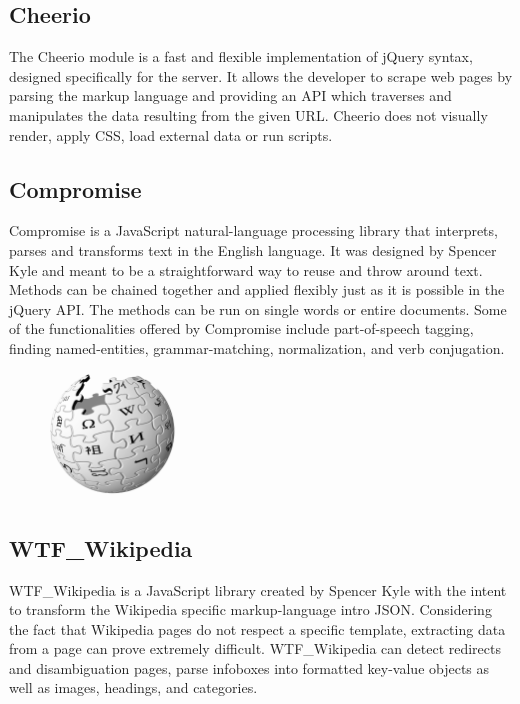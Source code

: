 \documentclass{report}
\begin{document}
\subsection {Cheerio}
The Cheerio module is a fast and flexible implementation of jQuery syntax, designed specifically for the server. It allows the developer to scrape web pages by parsing the markup language and providing an API which traverses and manipulates the data resulting from the given URL. Cheerio does not visually render, apply CSS, load external data or run scripts.

\subsection {Compromise}
Compromise is a JavaScript natural-language processing library that interprets, parses and transforms text in the English language. It was designed by Spencer Kyle and meant to be a straightforward way to reuse and throw around text. Methods can be chained together and applied flexibly just as it is possible in the jQuery API. The methods can be run on single words or entire documents. Some of the functionalities offered by Compromise include part-of-speech tagging, finding named-entities, grammar-matching, normalization, and verb conjugation. 

\begin{figure}
	\vspace*{-1.5cm}
    \centering
    \includegraphics[width=0.3\textwidth]{wiki}
	\vspace{-10pt} 
\end{figure}
\subsection {WTF\_Wikipedia}
WTF\_Wikipedia is a JavaScript library created by Spencer Kyle with the intent to transform the Wikipedia specific markup-language intro JSON. Considering the fact that Wikipedia pages do not respect a specific template, extracting data from a page can prove extremely difficult. WTF\_Wikipedia can detect redirects and disambiguation pages, parse infoboxes into formatted key-value objects as well as images, headings, and categories.
\end{document}
